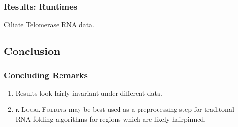 \documentclass{beamer}
\newcommand{\klf}{\textsc{k-Local Folding}\xspace}
\begin{document}
\begin{frame}
\frametitle{Results: Runtimes}
Ciliate Telomerase RNA data.
\begin{figure}
\end{figure}
\end{frame}


\begin{frame}
\section{Conclusion}
\frametitle{Concluding Remarks}
\begin{enumerate}
\item Results look fairly invariant under different data. 
\item \klf may be best used as a preprocessing step for traditonal  RNA folding algorithms for regions which are likely hairpinned. 
\end{enumerate}
\end{frame}
\end{document}
